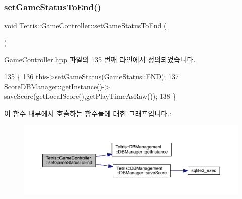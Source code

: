 \subsubsection{\texorpdfstring{set\+Game\+Status\+To\+End()}{setGameStatusToEnd()}\hspace{0.1cm}{\footnotesize\ttfamily [2/2]}}
{\footnotesize\ttfamily void Tetris\+::\+Game\+Controller\+::set\+Game\+Status\+To\+End (\begin{DoxyParamCaption}{ }\end{DoxyParamCaption})\hspace{0.3cm}{\ttfamily [inline]}}



Game\+Controller.\+hpp 파일의 135 번째 라인에서 정의되었습니다.


\begin{DoxyCode}
135                                      \{
136                 this->\hyperlink{class_tetris_1_1_game_controller_a013cef75ba09bdb7d95ae1df8497b8f5}{setGameStatus}(\hyperlink{class_tetris_1_1_game_controller_a96a963b56385f3b3a122ff0ca2beb770ab1a326c06d88bf042f73d70f50197905}{GameStatus::END});
137                 \hyperlink{class_tetris_1_1_d_b_management_1_1_d_b_manager_a9cb81505055490211a9b5c79c3c22c18}{ScoreDBManager::getInstance}()->
      \hyperlink{class_tetris_1_1_d_b_management_1_1_d_b_manager_aef16da1d2e564caa309bfc3b3e419d7e}{saveScore}(\hyperlink{class_tetris_1_1_game_controller_ad88f3362af23d87282ee8ed39394054d}{getLocalScore}(),\hyperlink{class_tetris_1_1_game_controller_afce7f1fc500acedd99636b837f9bccf4}{getPlayTimeAsRaw}());
138             \}
\end{DoxyCode}
이 함수 내부에서 호출하는 함수들에 대한 그래프입니다.\+:
\nopagebreak
\begin{figure}[H]
\begin{center}
\leavevmode
\includegraphics[width=350pt]{db/dd2/class_tetris_1_1_game_controller_a3c5e6034b2e2faf70371a13eb5f9c5bb_cgraph}
\end{center}
\end{figure}
\mbox{\label{class_tetris_1_1_game_controller_a47681985e6fbf14411a70be08f85bf99}} 
